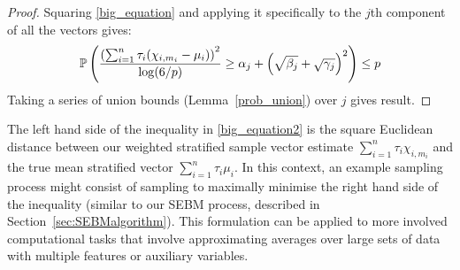 \begin{theorem}

\end{theorem}
\begin{proof}
Squaring \eqref{big_equation} and applying it specifically to the $j$th component of all the vectors gives:
\begin{equation*}
\operatorname{\mathbb{P}}\left(\frac{\left(\sum_{i=1}^n\tau_i(\chi_{i,m_i}-\mu_i)\right)^2}{\log(6/p)} 
\ge \alpha_{j} 
+ \left(\sqrt{\beta_{j}} 
+ \sqrt{\gamma_{j}}\right)^2  \right)
\le p 
\end{equation*}
Taking a series of union bounds (Lemma~\ref{prob_union}) over $j$ gives result.
\end{proof}

The left hand side of the inequality in \eqref{big_equation2} is the square Euclidean distance between our weighted stratified sample vector estimate $\sum_{i=1}^n\tau_i\chi_{i,m_i}$ and the true mean stratified vector $\sum_{i=1}^n\tau_i\mu_{i}$.
In this context, an example sampling process might consist of sampling to maximally minimise the right hand side of the inequality (similar to our SEBM process, described in Section~\ref{sec:SEBMalgorithm}).
This formulation can be applied to more involved computational tasks that involve approximating averages over large sets of data with multiple features or auxiliary variables.


